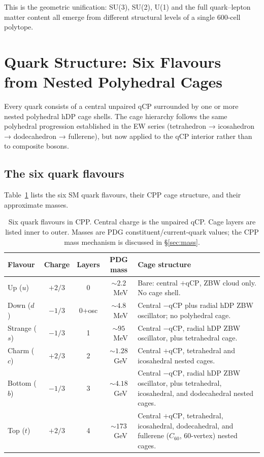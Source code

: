 \documentclass[11pt,a4paper]{article}
\newcommand{\qCP}{\mathrm{qCP}}
\begin{document}
This is the geometric unification: SU(3), SU(2), U(1) and the full
quark--lepton matter content all emerge from different structural
levels of a single 600-cell polytope.

\section{Quark Structure: Six Flavours from Nested Polyhedral Cages}
\label{sec:quarks}

Every quark consists of a central unpaired qCP surrounded by one or
more nested polyhedral hDP cage shells.  The cage hierarchy follows
the same polyhedral progression established in the EW series
(tetrahedron → icosahedron → dodecahedron → fullerene), but now
applied to the qCP interior rather than to composite bosons.

\subsection{The six quark flavours}

Table~\ref{tab:quarks} lists the six SM quark flavours, their CPP
cage structure, and their approximate masses.

\begin{table}[H]
\centering
\caption{Six quark flavours in CPP.  Central charge is the
  unpaired qCP.  Cage layers are listed inner to outer.
  Masses are PDG constituent/current-quark values; the CPP mass
  mechanism is discussed in \S\ref{sec:mass}.}
\label{tab:quarks}
\begin{tabular}{@{}p{1.8cm}cccp{5.5cm}@{}}
\toprule
Flavour & Charge & Layers & PDG mass & Cage structure \\
\midrule
Up ($u$) & $+2/3$ & 0 & $\sim2.2$~MeV & Bare: central $+\qCP$,
  ZBW cloud only.  No cage shell. \\[4pt]
Down ($d$) & $-1/3$ & 0+osc & $\sim4.8$~MeV & Central $-\qCP$
  plus radial hDP ZBW oscillator; no polyhedral cage. \\[4pt]
Strange ($s$) & $-1/3$ & 1 & $\sim95$~MeV & Central $-\qCP$,
  radial hDP ZBW oscillator, plus tetrahedral cage. \\[4pt]
Charm ($c$) & $+2/3$ & 2 & $\sim1.28$~GeV & Central $+\qCP$,
  tetrahedral and icosahedral nested cages. \\[4pt]
Bottom ($b$) & $-1/3$ & 3 & $\sim4.18$~GeV & Central $-\qCP$,
  radial hDP ZBW oscillator, plus tetrahedral, icosahedral,
  and dodecahedral nested cages. \\[4pt]
Top ($t$) & $+2/3$ & 4 & $\sim173$~GeV & Central $+\qCP$,
  tetrahedral, icosahedral, dodecahedral, and fullerene
  ($C_{60}$, 60-vertex) nested cages. \\
\bottomrule
\end{tabular}
\end{table}
\end{document}
